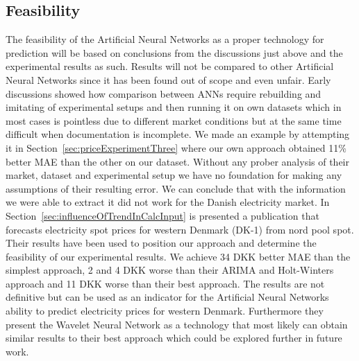 \subsection{Feasibility}
The feasibility of the Artificial Neural Networks as a proper technology for prediction will be based on conclusions from the discussions just above and the experimental results as such. Results will not be compared to other Artificial Neural Networks since it has been found out of scope and even unfair. Early discussions showed how comparison between ANNs require rebuilding and imitating of experimental setups and then running it on own datasets which in most cases is pointless due to different market conditions but at the same time difficult when documentation is incomplete. We made an example by attempting it in Section~\ref{sec:priceExperimentThree} where our own approach obtained 11\% better MAE than the other on our dataset. Without any prober analysis of their market, dataset and experimental setup we have no foundation for making any assumptions of their resulting error. We can conclude that with the information we were able to extract it did not work for the Danish electricity market. In Section~\ref{sec:influenceOfTrendInCalcInput} is presented a publication that forecasts electricity spot prices for western Denmark (DK-1) from nord pool spot. Their results have been used to position our approach and determine the feasibility of our experimental results. We achieve 34 DKK better MAE than the simplest approach, 2 and 4 DKK worse than their ARIMA and Holt-Winters approach and 11 DKK worse than their best approach. The results are not definitive but can be used as an indicator for the Artificial Neural Networks ability to predict electricity prices for western Denmark. Furthermore they present the Wavelet Neural Network as a technology that most likely can obtain similar results to their best approach which could be explored further in future work.

